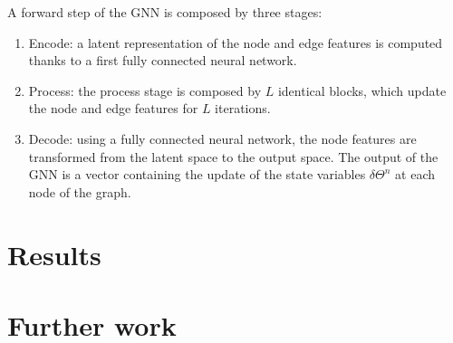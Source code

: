 \documentclass[11pt,a4paper]{article}
\begin{document}
A forward step of the GNN is composed by three stages:
\begin{enumerate}
    \item Encode: a latent representation of the node and edge features is computed thanks to a first fully connected neural network.
    \item Process: the process stage is composed by \(L\) identical blocks, which update the node and edge features for \(L\) iterations. 
    \item Decode: using a fully connected neural network, the node features are transformed from the latent space to the output space. The output of the GNN is a vector containing the update of the state variables \(\delta\Theta^n\) at each node of the graph.
\end{enumerate}



\section{Results}



\section{Further work}


\newpage
\end{document}

